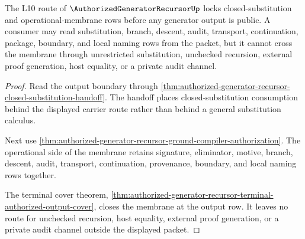 \begin{theorem}
\label{thm:authorized-generator-recursor-substitution-membrane-lock}
The L10 route of $\AuthorizedGeneratorRecursorUp$ locks closed-substitution and operational-membrane rows before any generator output is public. A consumer may read substitution, branch, descent, audit, transport, continuation, package, boundary, and local naming rows from the packet, but it cannot cross the membrane through unrestricted substitution, unchecked recursion, external proof generation, host equality, or a private audit channel.
\end{theorem}
\begin{proof}
Read the output boundary through \autoref{thm:authorized-generator-recursor-closed-substitution-handoff}. The handoff places closed-substitution consumption behind the displayed carrier route rather than behind a general substitution calculus.

Next use \autoref{thm:authorized-generator-recursor-ground-compiler-authorization}. The operational side of the membrane retains signature, eliminator, motive, branch, descent, audit, transport, continuation, provenance, boundary, and local naming rows together.

The terminal cover theorem, \autoref{thm:authorized-generator-recursor-terminal-authorized-output-cover}, closes the membrane at the output row. It leaves no route for unchecked recursion, host equality, external proof generation, or a private audit channel outside the displayed packet.
\end{proof}

